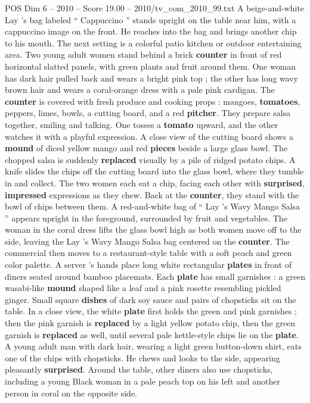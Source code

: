\begin{textsample}{POS Dim 6 – 2010 – Score 19.00 – 2010/tv\_com\_2010\_99.txt}
A beige-and-white Lay ’s bag labeled “ Cappuccino ” stands upright on the table near him, with a cappuccino image on the front.
He reaches into the bag and brings another chip to his mouth.
The next setting is a colorful patio kitchen or outdoor entertaining area.
Two young adult women stand behind a brick \textbf{counter} in front of red horizontal slatted panels, with green plants and fruit around them.
One woman has dark hair pulled back and wears a bright pink top ; the other has long wavy brown hair and wears a coral-orange dress with a pale pink cardigan.
The \textbf{counter} is covered with fresh produce and cooking props : mangoes, \textbf{tomatoes}, peppers, limes, bowls, a cutting board, and a red \textbf{pitcher}.
They prepare salsa together, smiling and talking.
One tosses a \textbf{tomato} upward, and the other watches it with a playful expression.
A close view of the cutting board shows a \textbf{mound} of diced yellow mango and red \textbf{pieces} beside a large glass bowl.
The chopped salsa is suddenly \textbf{replaced} visually by a pile of ridged potato chips.
A knife slides the chips off the cutting board into the glass bowl, where they tumble in and collect.
The two women each eat a chip, facing each other with \textbf{surprised}, \textbf{impressed} expressions as they chew.
Back at the \textbf{counter}, they stand with the bowl of chips between them.
A red-and-white bag of “ Lay ’s Wavy Mango Salsa ” appears upright in the foreground, surrounded by fruit and vegetables.
The woman in the coral dress lifts the glass bowl high as both women move off to the side, leaving the Lay ’s Wavy Mango Salsa bag centered on the \textbf{counter}.
The commercial then moves to a restaurant-style table with a soft peach and green color palette.
A server ’s hands place long white rectangular \textbf{plates} in front of diners seated around bamboo placemats.
Each \textbf{plate} has small garnishes : a green wasabi-like \textbf{mound} shaped like a leaf and a pink rosette resembling pickled ginger.
Small square \textbf{dishes} of dark soy sauce and pairs of chopsticks sit on the table.
In a close view, the white \textbf{plate} first holds the green and pink garnishes ; then the pink garnish is \textbf{replaced} by a light yellow potato chip, then the green garnish is \textbf{replaced} as well, until several pale kettle-style chips lie on the \textbf{plate}.
A young adult man with dark hair, wearing a light green button-down shirt, eats one of the chips with chopsticks.
He chews and looks to the side, appearing pleasantly \textbf{surprised}.
Around the table, other diners also use chopsticks, including a young Black woman in a pale peach top on his left and another person in coral on the opposite side.

\end{textsample}
